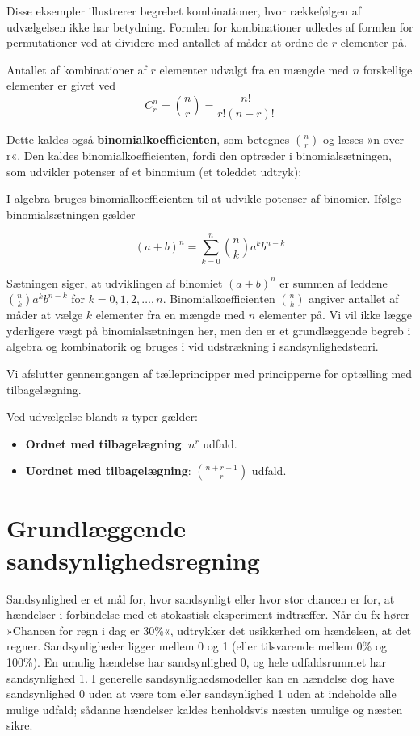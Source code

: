 Disse eksempler illustrerer begrebet kombinationer, hvor rækkefølgen af udvælgelsen ikke har betydning. Formlen for kombinationer udledes af formlen for permutationer ved at dividere med antallet af måder at ordne de $r$ elementer på.

\begin{theorem}[Kombinationer]
    Antallet af kombinationer af $r$ elementer udvalgt fra en mængde med $n$ forskellige elementer er givet ved
    \[
    C_r^n = \binom{n}{r} = \frac{n!}{r!(n-r)!}
    \]
\end{theorem}

Dette kaldes også \textbf{binomialkoefficienten}, som betegnes $\binom{n}{r}$ og læses »n over r«. Den kaldes binomialkoefficienten, fordi den optræder i binomialsætningen, som udvikler potenser af et binomium (et toleddet udtryk):

\begin{theorem}[Binomialsætningen]
    I algebra bruges binomialkoefficienten til at udvikle potenser af binomier. Ifølge binomialsætningen gælder

$$
(a+b)^n=\sum_{k=0}^n\binom{n}{k} a^k b^{n-k}
$$

\end{theorem}

Sætningen siger, at udviklingen af binomiet $(a+b)^n$ er summen af leddene $\binom{n}{k} a^k b^{n-k}$ for $k=0,1,2,\ldots,n$. Binomialkoefficienten $\binom{n}{k}$ angiver antallet af måder at vælge $k$ elementer fra en mængde med $n$ elementer på. Vi vil ikke lægge yderligere vægt på binomialsætningen her, men den er et grundlæggende begreb i algebra og kombinatorik og bruges i vid udstrækning i sandsynlighedsteori.

Vi afslutter gennemgangen af tælleprincipper med principperne for optælling med tilbagelægning.

\begin{proposition}
Ved udvælgelse blandt $n$ typer gælder:
\begin{itemize}
    \item \textbf{Ordnet med tilbagelægning}: $n^r$ udfald.
    \item \textbf{Uordnet med tilbagelægning}: $\displaystyle \binom{n+r-1}{r}$ udfald. %
\end{itemize}
\end{proposition}

\section{Grundlæggende sandsynlighedsregning}
Sandsynlighed er et mål for, hvor sandsynligt eller hvor stor chancen er for, at hændelser i forbindelse med et stokastisk eksperiment indtræffer. Når du fx hører »Chancen for regn i dag er 30\%«, udtrykker det usikkerhed om hændelsen, at det regner. Sandsynligheder ligger mellem 0 og 1 (eller tilsvarende mellem 0\% og 100\%). En umulig hændelse har sandsynlighed 0, og hele udfaldsrummet har sandsynlighed 1. I generelle sandsynlighedsmodeller kan en hændelse dog have sandsynlighed 0 uden at være tom eller sandsynlighed 1 uden at indeholde alle mulige udfald; sådanne hændelser kaldes henholdsvis næsten umulige og næsten sikre.

